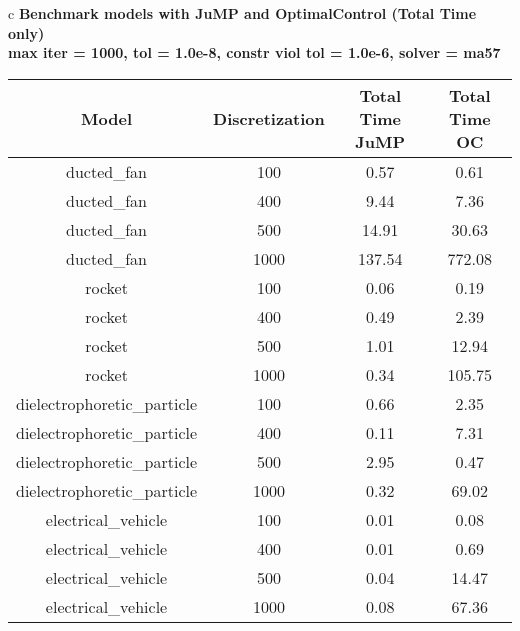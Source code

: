 \documentclass{standalone}
\begin{document}
\begin{tabular}{c}
\Large\textbf{Benchmark models with JuMP and OptimalControl (Total Time only)}\\
\large\textbf{max iter = 1000, tol = 1.0e-8, constr viol tol = 1.0e-6, solver = ma57}\\
\begin{tabular}{cccc}
  \hline
  \textbf{Model} & \textbf{Discretization} & \textbf{Total Time JuMP} & \textbf{Total Time OC} \\\hline
  ducted\_fan & 100 & 0.57 & 0.61 \\
  ducted\_fan & 400 & 9.44 & 7.36 \\
  ducted\_fan & 500 & 14.91 & 30.63 \\
  ducted\_fan & 1000 & 137.54 & 772.08 \\
  rocket & 100 & 0.06 & 0.19 \\
  rocket & 400 & 0.49 & 2.39 \\
  rocket & 500 & 1.01 & 12.94 \\
  rocket & 1000 & 0.34 & 105.75 \\
  dielectrophoretic\_particle & 100 & 0.66 & 2.35 \\
  dielectrophoretic\_particle & 400 & 0.11 & 7.31 \\
  dielectrophoretic\_particle & 500 & 2.95 & 0.47 \\
  dielectrophoretic\_particle & 1000 & 0.32 & 69.02 \\
  electrical\_vehicle & 100 & 0.01 & 0.08 \\
  electrical\_vehicle & 400 & 0.01 & 0.69 \\
  electrical\_vehicle & 500 & 0.04 & 14.47 \\
  electrical\_vehicle & 1000 & 0.08 & 67.36 \\\hline
\end{tabular}
\end{tabular}
\end{document}
